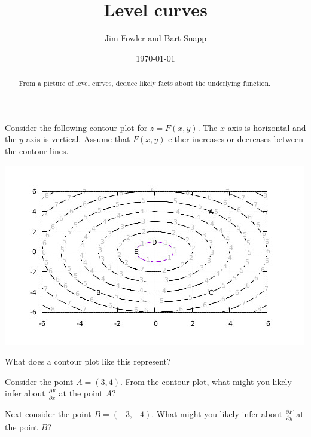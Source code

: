 \documentclass{ximera}
\author{Jim Fowler and Bart Snapp}
\date{\today}
\title{Level curves}
\begin{document}
\begin{abstract}
From a picture of level curves, deduce likely facts about the underlying function.
\end{abstract}

Consider the following contour plot for $z = F(x,y)$.  The $x$-axis is horizontal and the $y$-axis is vertical.  Assume that $F(x,y)$ either increases or decreases between the contour lines.
\begin{image}
\includegraphics[width=.9\linewidth]{contourPlot1.jpg}
\end{image}
\begin{exercise}
What does a contour plot like this represent?
\begin{multipleChoice}
\end{multipleChoice}
\end{exercise}


\begin{exercise}
Consider the point $A = (3,4)$.  From the contour plot, what might you likely infer about $\frac{\partial F}{\partial x}$ at the point $A$?
\begin{multipleChoice}
\end{multipleChoice}
\end{exercise}

\begin{exercise}
Next consider the point $B = (-3,-4)$.  What might you likely infer about $\frac{\partial F}{\partial y}$ at the point $B$?
\begin{multipleChoice}
\end{multipleChoice}
\end{exercise}
\end{document}
